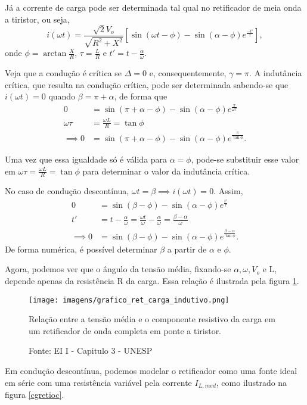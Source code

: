 Já a corrente de carga pode ser determinada tal qual no retificador de meia onda a tiristor, ou seja, \[
i(\omega{t}) = \frac{\sqrt{2}V_{o}}{\sqrt{R^2+X^2}}[\sin(\omega{t}-\phi)-\sin(\alpha-\phi)e^\frac{-t'}{\tau}]
,\] onde $\phi = \arctan\frac{X}{R}$, $\tau = \frac{L}{R}$ e $t' =  t - \frac{\alpha}{\omega}$.

Veja que a condução é crítica se $\Delta = 0$ e, consequentemente, $\gamma = \pi$. A indutância crítica, que resulta na condução crítica, pode ser determinada sabendo-se que $i(\omega{t}) = 0$ quando $\beta = \pi + \alpha$, de forma que
\begin{align*}
 0 &= \sin(\pi+\alpha-\phi) - \sin(\alpha - \phi)e^{\frac{\pi}{\omega\tau}} \\
\omega\tau &= \frac{\omega{L}}{R} = \tan\phi \\
 \implies 0 &= \sin(\pi+\alpha-\phi) - \sin(\alpha - \phi)e^{\frac{\pi}{\tan\phi}}
.\end{align*}

Uma vez que essa igualdade só é válida para $\alpha=\phi$, pode-se substituir esse valor em $\omega\tau = \frac{\omega{L}}{R} = \tan\phi$ para determinar o valor da indutância crítica.

No caso de condução descontínua, $\omega{t}=\beta \implies i(\omega{t})=0$. Assim,
\begin{align*}
 0 &= \sin(\beta-\phi) - \sin(\alpha - \phi)e^{\frac{t'}{\tau}} \\
t' &= t - \frac{\alpha}{\omega} = \frac{\omega{t}}{\omega} - \frac{\alpha}{\omega} = \frac{\beta-\alpha}{\omega} \\
 \implies 0 &= \sin(\beta-\phi) - \sin(\alpha - \phi)e^{\frac{\beta-\alpha}{\tan\phi}}
.\end{align*}
De forma numérica, é possível determinar $\beta$ a partir de $\alpha$ e $\phi$.

Agora, podemos ver que o ângulo da tensão média, fixando-se $\alpha, \omega, V_{o}$ e L, depende apenas da resistência R da carga. Essa relação é ilustrada pela figura \ref{gretioc0}.

\begin{figure}[h]
\center
\texttt{[image: imagens/grafico\_ret\_carga\_indutivo.png]}
\caption{Relação entre a tensão média e o componente resistivo da carga em um retificador de onda completa em ponte a tiristor.}\label{gretioc0}
\caption*{Fonte: EI I - Capitulo 3 - UNESP}
\end{figure}

Em condução descontínua, podemos modelar o retificador como uma fonte ideal em série com uma resistência variável pela corrente $I_{L,med}$, como ilustrado na figura \ref{cgretioc}.

